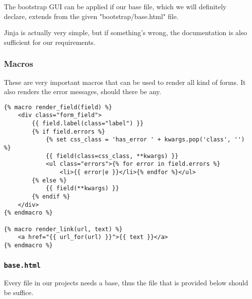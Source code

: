 \documentclass[../main/main.tex]{subfiles}
\begin{document}
The bootstrap GUI can be applied if our base file, which we will definitely
declare, extends from the given "bootstrap/base.html" file. 

Jinja is actually very simple, but if something's wrong, the documentation is
also sufficient for our requirements.  

\subsubsection{Macros}

These are very important macros that can be used to render all kind of forms. It
also renders the error messages, should there be any. 

\begin{lstlisting}
{% macro render_field(field) %}
    <div class="form_field">
        {{ field.label(class="label") }}
        {% if field.errors %}
            {% set css_class = 'has_error ' + kwargs.pop('class', '') %}
            {{ field(class=css_class, **kwargs) }}
            <ul class="errors">{% for error in field.errors %}
                <li>{{ error|e }}</li>{% endfor %}</ul>
        {% else %}
            {{ field(**kwargs) }}
        {% endif %}
    </div>
{% endmacro %}

{% macro render_link(url, text) %}
    <a href="{{ url_for(url) }}">{{ text }}</a>
{% endmacro %}
\end{lstlisting}

\subsubsection{\lstinline|base.html|}

Every file in our projects needs a base, thus the file that is provided below
should be suffice. 
\end{document}
